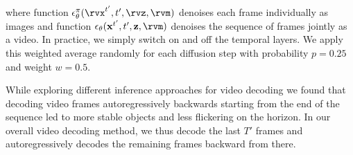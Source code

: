 where function $\mathbf{\epsilon}_{\theta}^{\pi}(\rvx^{t'}, t', \rvz, \rvm)$ denoises each frame individually  as images and function $\mathbf{\epsilon}_{\theta}(\mathbf{x}^{t'}, t', \mathbf{z}, \rvm)$ denoises the sequence of frames jointly as a video. In practice, we simply switch on and off the temporal layers. We apply this weighted average randomly for each diffusion step with probability $p=0.25$ and weight $w=0.5$.

While exploring different inference approaches for video decoding we found that decoding video frames autoregressively backwards starting from the end of the sequence led to more stable objects and less flickering on the horizon. In our overall video decoding method, we thus decode the last $T'$ frames and autoregressively decodes the remaining frames backward from there.




